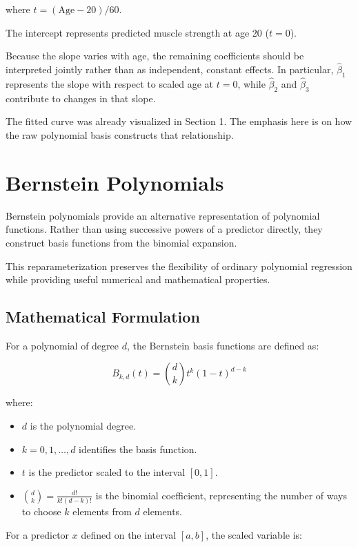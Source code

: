 \documentclass[
  letterpaper,
  DIV=11,
  numbers=noendperiod]{scrreprt}
\providecommand{\tightlist}{%
  \setlength{\itemsep}{0pt}\setlength{\parskip}{0pt}}
\begin{document}
where \(t=(\text{Age}-20)/60\).

The intercept represents predicted muscle strength at age 20 (\(t=0\)).

Because the slope varies with age, the remaining coefficients should be
interpreted jointly rather than as independent, constant effects. In
particular, \(\hat\beta_1\) represents the slope with respect to scaled
age at \(t=0\), while \(\hat\beta_2\) and \(\hat\beta_3\) contribute to
changes in that slope.

The fitted curve was already visualized in Section 1. The emphasis here
is on how the raw polynomial basis constructs that relationship.

\section{Bernstein Polynomials}\label{bernstein-polynomials}

Bernstein polynomials provide an alternative representation of
polynomial functions. Rather than using successive powers of a predictor
directly, they construct basis functions from the binomial expansion.

This reparameterization preserves the flexibility of ordinary polynomial
regression while providing useful numerical and mathematical properties.

\subsection{Mathematical Formulation}\label{mathematical-formulation-2}

For a polynomial of degree \(d\), the Bernstein basis functions are
defined as:

\[
\boxed{
B_{k,d}(t)=\binom{d}{k}t^k(1-t)^{d-k}
}
\]

where:

\begin{itemize}
\tightlist
\item
  \(d\) is the polynomial degree.
\item
  \(k=0,1,\ldots,d\) identifies the basis function.
\item
  \(t\) is the predictor scaled to the interval \([0,1]\).
\item
  \(\binom{d}{k}=\frac{d!}{k!(d-k)!}\) is the binomial coefficient,
  representing the number of ways to choose \(k\) elements from \(d\)
  elements.
\end{itemize}

For a predictor \(x\) defined on the interval \([a,b]\), the scaled
variable is:
\end{document}
